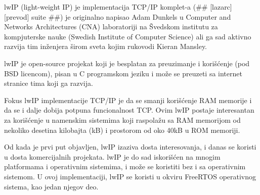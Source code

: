 \documentclass[a4paper,12pt, master]{etf}
\begin{document}
	lwIP (light-weight IP) je implementacija TCP/IP komplet-a (\#\# [lazarc] [prevod] suite
	\#\#) je originalno napisao Adam Dunkels u Computer and Networks Architectures (CNA)
	laboratoriji na	\v{S}vedskom institutu za kompjuterske nauke (Swedish Institute of Computer
	Science) ali ga sad	aktivno razvija tim in\v{z}enjera \v{s}irom sveta kojim rukovodi Kieran
	Mansley\@.

	lwIP je open-source projekat koji je besplatan za preuzimanje i kori\v{s}\'{c}enje (pod BSD
	licencom), pisan u C programskom jeziku i mo\v{z}e se preuzeti sa internet stranice tima koji
	ga razvija.

	Fokus lwIP implementacije TCP/IP je da se smanji kori\v{s}\'{c}enje RAM memorije i da se i dalje
	dobija potpuna funcionalnost TCP\@. Ovim lwIP postaje interesantan za kori\v{s}\'{c}enje u namenskim
	sistemima koji raspola\v{z}u sa RAM memorijom od nekoliko desetina kilobajta (kB) i prostorom od
	oko 40kB u ROM memoriji.

	Od kada je prvi put objavljen, lwIP izaziva dosta interesovanja, i danas se koristi u dosta
	komercijalnih projekata\@. lwIP je do sad iskori\v{s}\'{c}en na mnogim platformama i operativnim
	sistemima, i mo\v{z}e se koristiti bez i sa operativnim sistemom. U ovoj implementaciji, lwIP
	se koristi u okviru FreeRTOS operativnog sistema, kao jedan njegov deo.
\end{document}
